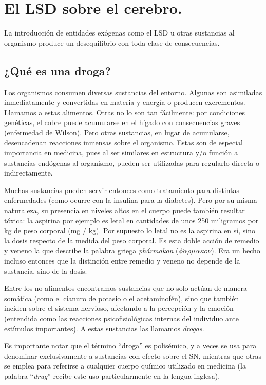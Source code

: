 \section{El LSD sobre el cerebro.}

La introducción de entidades exógenas como el LSD u otras sustancias al organismo produce un desequilibrio con toda clase de consecuencias.

\subsection{¿Qué es una droga?}

Los organismos consumen diversas sustancias del entorno. Algunas son asimiladas inmediatamente y convertidas en materia y energía o producen excrementos. Llamamos a estas alimentos. Otras no lo son tan fácilmente: por condiciones genéticas, el cobre puede acumularse en el hígado con consecuencias graves (enfermedad de Wilson). Pero otras sustancias, en lugar de acumularse, desencadenan reacciones inmensas sobre el organismo. Estas son de especial importancia en medicina, pues al ser similares en estructura y/o función a sustancias endógenas al organismo, pueden ser utilizadas para regularlo directa o indirectamente.

Muchas sustancias pueden servir entonces como tratamiento para distintas enfermedades (como ocurre con la insulina para la diabetes). Pero por su misma naturaleza, su presencia en niveles altos en el cuerpo puede también resultar tóxica: la aspirina por ejemplo es letal en cantidades de unos 250 miligramos por kg de peso corporal (mg / kg). Por supuesto lo letal no es la aspirina en sí, sino la dosis respecto de la medida del peso corporal. Es esta doble acción de remedio y veneno la que describe la palabra griega \textit{phármakon} ($\phi\acute{\alpha}\rho\mu\alpha\kappa o\nu$). Era un hecho incluso entonces que la distinción entre remedio y veneno no depende de la sustancia, sino de la dosis.

Entre los no-alimentos encontramos sustancias que no solo actúan de manera somática (como el cianuro de potasio o el acetaminofén), sino que también inciden sobre el sistema nervioso, afectando a la percepción y la emoción (entendida como las reacciones psicofisiológicas internas del individuo ante estímulos importantes). A estas sustancias las llamamos \textit{drogas}.

Es importante notar que el término \enquote{droga} es polisémico, y a veces se usa para denominar exclusivamente a sustancias con efecto sobre el SN, mientras que otras se emplea para referirse a cualquier cuerpo químico utilizado en medicina (la palabra \enquote{\textit{drug}} recibe este uso particularmente en la lengua inglesa).

